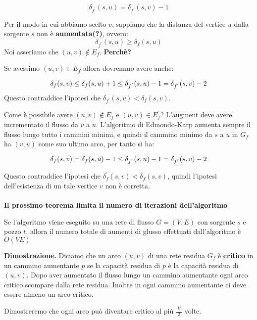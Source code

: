 $$
    \delta_{f^{'}}(s,u) = \delta_{f^{'}}(s,v) -1
$$

Per il modo in cui abbiamo scelto $v$, sappiamo che la distanza del vertice $u$ dalla sorgente $s$ non è \textbf{aumentata(?)}, ovvero:
$$
    \delta_{f^{'}}(s,u) \ge \delta_{f}(s,u) 
$$
Noi asseriamo che $(u,v) \notin E_f$. \textbf{Perchè?}

Se avessimo $(u,v) \in E_f$ allora dovremmo avere anche:

$$
    \delta_{f}(s,v) \le \delta_{f}(s,u) +1 \\
    \le \delta_{f^{'}}(s,u) -1 \\
    = \delta_{f^{'}}(s,v) -2
$$
 Questo contraddice l'ipotesi che $\delta_{f^{'}}(s,v) < \delta_{f}(s,v)$.

 Come è possibile avere $(u,v) \notin E_f$ e $(u,v) \in E_f^{'}$?
L'augment deve avere incrementato il flusso da $v$ a $u$. L'algoritmo di Edmondo-Karp aumenta sempre il flusso lungo tutto i cammini minimi, e quindi il cammino minimo da $s$ a $u$ in $G_f$ ha $(v,u)$ come suo ultimo arco, per tanto si ha:

$$
    \delta_{f}(s,v) = \delta_{f}(s,u) -1 \\
    \le \delta_{f^{'}}(s,u) -1 \\
    = \delta_{f^{'}}(s,v) -2
$$

Questo contraddice l'ipotesi che $\delta_f^{'}(s,v) < \delta_f(s,v)$, quindi l'ipotesi dell'esistenza di un tale vertice $v$ non è corretta.\\
\\
\textbf{Il prossimo teorema limita il numero di iterazioni dell'algoritmo}

\begin{myblockquote}
    Se l'algoritmo viene eseguito su una rete di flusso $G = (V, E)$ con sorgente $s$ e pozzo $t$, allora il numero totale di aumenti di glusso effettuati dall'algoritmo è $O(VE)$
\end{myblockquote}

\textbf{Dimostrazione.} Diciamo che un arco $(u,v)$ di una rete residua $G_f$ è \textbf{critico} in un cammino aumentante $p$ se la capacità residua di $p$ è la capacità residua di $(u,v)$.
Dopo aver aumentato il flusso lungo un cammino aumentante ogni arco critico scompare dalla rete residua. Inoltre in ogni cammino aumentante ci deve essere almeno un arco critico.

Dimostreremo che ogni arco può diventare critico al più $\frac{|V|}{2}$ volte.\\

